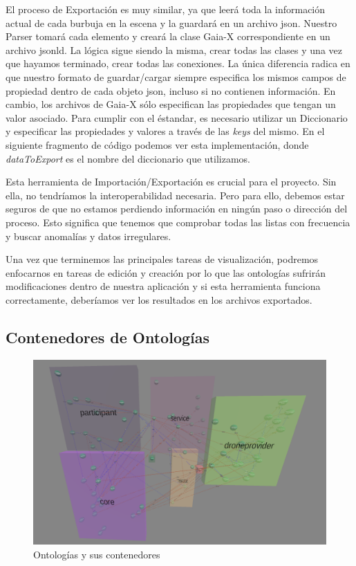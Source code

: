 El proceso de Exportación es muy similar, ya que leerá toda la información actual de cada burbuja en la escena y la guardará en un archivo json. Nuestro Parser tomará cada elemento y creará la clase Gaia-X correspondiente en un archivo jsonld. La lógica sigue siendo la misma, crear todas las clases y una vez que hayamos terminado, crear todas las conexiones. La única diferencia radica en que nuestro formato de guardar/cargar siempre especifica los mismos campos de propiedad dentro de cada objeto json, incluso si no contienen información. En cambio, los archivos de Gaia-X sólo especifican las propiedades que tengan un valor asociado. Para cumplir con el éstandar,
es necesario utilizar un Diccionario y especificar las propiedades y valores a través de las \textit{keys} del mismo. En el siguiente fragmento de código podemos ver esta implementación, donde \textit{dataToExport} es el nombre del diccionario que utilizamos.



Esta herramienta de Importación/Exportación es crucial para el proyecto. Sin ella, no tendríamos la interoperabilidad necesaria. Pero para ello, debemos estar seguros de que no estamos perdiendo información en ningún paso o dirección del proceso. Esto significa que tenemos que comprobar todas las listas con frecuencia y buscar anomalías y datos irregulares.

Una vez que terminemos las principales tareas de visualización, podremos enfocarnos en tareas de edición y creación por lo que las ontologías sufrirán modificaciones dentro de nuestra aplicación y si esta herramienta funciona correctamente, deberíamos ver los resultados en los archivos exportados.

\subsection{Contenedores de Ontologías}

\begin{figure}[ht]
   \begin{center}
      \includegraphics[width=0.8\linewidth]{chapter2/figures/ontologies&containers.png}
   \end{center}
   \caption[Ontologías y sus contenedores]
   {\footnotesize Ontologías y sus contenedores}
\end{figure}

